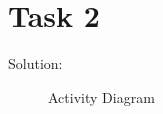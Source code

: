 \chapter{Task 2}
\begin{parlist}
	\item Solution:
	\begin{figure}[hbt]
  \caption{Activity Diagram}
  \label{fig:ActDia}
\end{figure}

\end{parlist}
    
